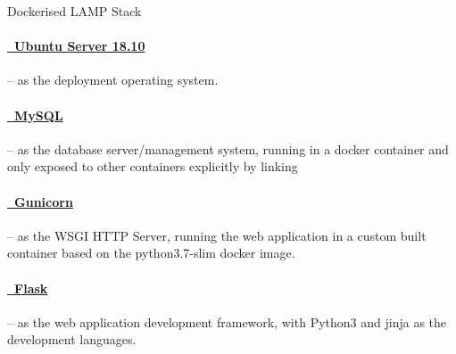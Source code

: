 \begin{displaytable}{\label{display:lamp_stack}}{Dockerised LAMP Stack}
  \paragraph{\href{http://releases.ubuntu.com/18.10/ubuntu-18.10-live-server-amd64.iso}{\faUbuntu\ Ubuntu Server 18.10}}
  \hspace{-0.6em}-- as the deployment operating system.
  \paragraph{\href{https://hub.docker.com/\_/mysql}{\faDatabase\ MySQL}}
  \hspace{-0.6em}-- as the database server/management system, running in a docker container and only exposed to other containers explicitly by linking
  \paragraph{\href{https://pypi.org/project/gunicorn/}{\faServer\ Gunicorn}}
  \hspace{-0.6em}-- as the WSGI HTTP Server, running the web application in a custom built container based on the python3.7-slim docker image.
  \paragraph{\href{https://pypi.org/project/Flask/1.0.2/}{\faPython\ Flask}}
  \hspace{-0.6em}-- as the web application development framework, with Python3 and jinja as the development languages.
  \vspace{1em}
\end{displaytable}
